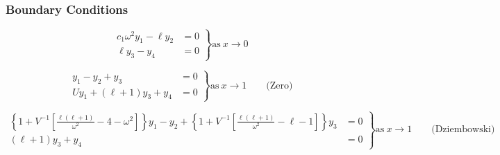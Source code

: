 \documentclass[fleqn]{article}
\newcommand{\Rstar}{\ensuremath{R_{\ast}}}
\newcommand{\Lrad}{\ensuremath{L_{\rm rad}}}
\newcommand{\Lstar}{\ensuremath{L_{\ast}}}
\begin{document}
\subsubsection*{Boundary Conditions}

\begin{equation*}
\left.
\begin{aligned}
c_{1} \omega^{2} y_{1} - \ell y_{2} &= 0 \\
\ell y_{3} - y_{4} &= 0
\end{aligned}
\right\}
\text{as}\ x \rightarrow 0
\end{equation*}

\begin{equation*}
\left.
\begin{aligned}
y_{1} - y_{2} + y_{3} &= 0 \\
U y_{1} + (\ell + 1) y_{3} + y_{4} &= 0
\end{aligned}
\right\}
\text{as}\ x \rightarrow 1 \qquad \text{(Zero)}
\end{equation*}

\begin{equation*}
\left.
\begin{aligned}
\left\{ 1 + V^{-1} \left[ \frac{\ell(\ell+1)}{\omega^{2}} - 4 - \omega^{2} \right] \right\} y_{1} -
y_{2} +
\left\{ 1 + V^{-1} \left[ \frac{\ell(\ell+1)}{\omega^{2}} - \ell - 1 \right] \right\} y_{3} &= 0 \\
(\ell + 1) y_{3} + y_{4} &= 0
\end{aligned}
\right\} 
\text{as}\ x \rightarrow 1 \qquad \text{(Dziembowski)}
\end{equation*}





\end{document}
